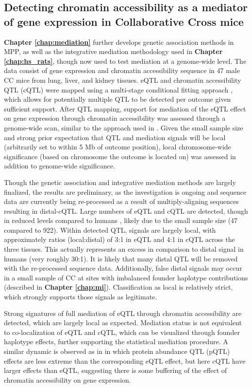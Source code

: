 \subsection{Detecting chromatin accessibility as a mediator of gene expression in Collaborative Cross mice}

\textbf{Chapter \ref{chap:mediation}} further develops genetic association methods in MPP, as well as the integrative mediation methodology used in \textbf{Chapter \ref{chap:hs_rats}}, though now used to test mediation at a genome-wide level. The data consist of gene expression and chromatin accessibility sequence in 47 male CC mice from lung, liver, and kidney tissues. eQTL and chromatin accessibility QTL (cQTL) were mapped using a multi-stage conditional fitting approach \citep{Jansen2017}, which allows for potentially multiple QTL to be detected per outcome given sufficient support. After QTL mapping, support for mediation of the eQTL effect on gene expression through chromatin accessibility was assessed through a genome-wide scan, similar to the approach used in \cite{Chick2016}. Given the small sample size and strong prior expectation that QTL and mediation signals will be local (arbitrarily set to within 5 Mb of outcome position), local chromosome-wide significance (based on chromosome the outcome is located on) was assessed in addition to genome-wide significance.

Though the genetic association and integrative mediation methods are largely finalized, the results are preliminary, as the investigation is ongoing and sequence data are currently being re-processed as a result of multiply-aligning sequences resulting in distal-cQTL. Large numbers of eQTL and cQTL are detected, though in reduced levels compared to humans \citep{Battle2014}, likely due to the small sample size (47 compared to 922). Within detected QTL, signals are largely local, with approximately ratios (local:distal) of 3:1 in eQTL and 4:1 in cQTL across the three tissues. This actually represents an excess in comparison to distal signal in humans (very roughly 30:1). It is likely that many distal QTL will be removed with the re-processed sequence data. Additionally, false distal signals may occur in a small sample of CC at sites with imbalanced founder haplotype contributions (described in \textbf{Chapter \ref{chap:mi}}). Classification as local is relatively strict, which strongly supports those signals as legitimate.

Strong signatures of full mediation of eQTL through chromatin accessibility are detected, which are largely local as expected. Mediation status is not equivalent to co-localization of eQTL and cQTL, which can be visualized through founder haplotype effects, further supporting the statistical mediation procedure. A similar dynamic is observed as in \cite{Battle2015} in which protein abundance QTL (pQTL) effects are less extreme than the corresponding eQTL effect, but here cQTL have larger effects than eQTL, suggesting there is some buffering of the effect of chromatin accessibility on gene expression.

